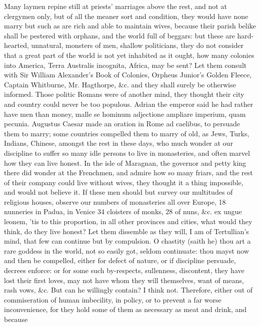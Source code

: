 {Many laymen repine still at priests' marriages above the rest, and not
at clergymen only, but of all the meaner sort and condition, they would
have none marry but such as are rich and able to maintain wives,
because their parish belike shall be pestered with orphans, and the
world full of beggars: but these are hard-hearted, unnatural,
monsters of men, shallow politicians, they do not consider that a
great part of the world is not yet inhabited as it ought, how many
colonies into America, Terra Australis incognita, Africa, may be sent?
Let them consult with Sir William Alexander's Book of Colonies, Orpheus
Junior's Golden Fleece, Captain Whitburne, Mr. Hagthorpe, \&c. and they
shall surely be otherwise informed. Those politic Romans were of
another mind, they thought their city and country could never be too
populous. Adrian the emperor said he had rather have men than
money, malle se hominum adjectione ampliare imperium, quam pecunia.
Augustus Caesar made an oration in Rome ad caelibus, to persuade them
to marry; some countries compelled them to marry of old, as Jews,
Turks, Indians, Chinese, amongst the rest in these days, who much
wonder at our discipline to suffer so many idle persons to live in
monasteries, and often marvel how they can live honest. In the
isle of Maragnan, the governor and petty king there did wonder at the
Frenchmen, and admire how so many friars, and the rest of their company
could live without wives, they thought it a thing impossible, and would
not believe it. If these men should but survey our multitudes of
religious houses, observe our numbers of monasteries all over Europe,
18 nunneries in Padua, in Venice 34 cloisters of monks, 28 of nuns, \&c.
ex ungue leonem, 'tis to this proportion, in all other provinces and
cities, what would they think, do they live honest? Let them dissemble
as they will, I am of Tertullian's mind, that few can continue but by
compulsion. O chastity (saith he) thou art a rare goddess in the
world, not so easily got, seldom continuate: thou mayst now and then be
compelled, either for defect of nature, or if discipline persuade,
decrees enforce: or for some such by-respects, sullenness, discontent,
they have lost their first loves, may not have whom they will
themselves, want of means, rash vows, \&c. But can he willingly contain?
I think not. Therefore, either out of commiseration of human
imbecility, in policy, or to prevent a far worse inconvenience, for
they hold some of them as necessary as meat and drink, and because
}
